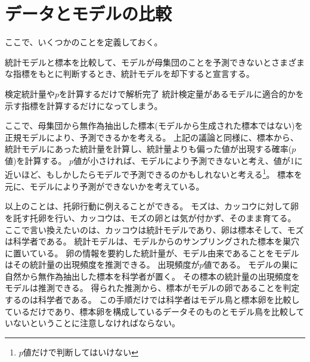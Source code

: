 \section{データとモデルの比較}
ここで、いくつかのことを定義しておく。
\begin{defi}
    統計モデルと標本を比較して、モデルが母集団のことを予測できないとさまざまな指標をもとに判断するとき、統計モデルを却下すると宣言する。
\end{defi}

\begin{SMbox}{検定統計量や$p$を計算するだけで解析完了}
    統計検定量があるモデルに適合的かを示す指標を計算するだけになってしまう。
\end{SMbox}


ここで、母集団から無作為抽出した標本(モデルから生成された標本ではない)を正規モデルにより、予測できるかを考える。
上記の議論と同様に、標本から、統計モデルにあった統計量を計算し、統計量よりも偏った値が出現する確率($p$値)を計算する。
$p$値が小さければ、モデルにより予測できないと考え、値が1に近いほど、もしかしたらモデルで予測できるのかもしれないと考える\footnote{$p$値だけで判断してはいけない}。
標本を元に、モデルにより予測ができないかを考えている。



以上のことは、托卵行動に例えることができる。
モズは、カッコウに対して卵を託す托卵を行い、カッコウは、モズの卵とは気が付かず、そのまま育てる。
ここで言い換えたいのは、カッコウは統計モデルであり、卵は標本そして、モズは科学者である。
統計モデルは、モデルからのサンプリングされた標本を巣穴に置いている。
卵の情報を要約した統計量が、モデル由来であることをモデルはその統計量の出現頻度を推測できる。
出現頻度が$p$値である。
モデルの巣に自然から無作為抽出した標本を科学者が置く。
その標本の統計量の出現頻度をモデルは推測できる。
得られた推測から、標本がモデルの卵であることを判定するのは科学者である。
この手順だけでは科学者はモデル鳥と標本卵を比較しているだけであり、標本卵を構成しているデータそのものとモデル鳥を比較していないということに注意しなければならない。



